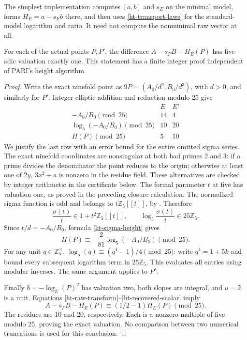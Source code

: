The simplest implementation computes \([a,b]\) and \(s_E\) on the
minimal model, forms \(H_E=a-s_Eb\) there, and then uses
\eqref{ht-transport-laws} for the standard-model logarithm and ratio.
It need not compute the nonminimal raw vector at all.

\begin{theorem}
\label{ht-mod25}
For each of the actual points \(P,P'\), the difference
\(A-s_FB-H_E(P)\) has five-adic valuation exactly one. This statement
has a finite integer proof independent of PARI's height algorithm.
\end{theorem}
\begin{proof}
Write the exact ninefold point as
\(9P=(A_0/d^2,B_0/d^3)\), with \(d>0\), and similarly for \(P'\).
Integer elliptic addition and reduction modulo 25 give
\[
\begin{array}{c|cc}
 &E&E'\\ \hline
 -A_0/B_0\pmod {25}&14&4\\
 \log_5(-A_0/B_0)\pmod {25}&10&20\\
 H(P)\pmod {25}&5&10
\end{array}
\]
We justify the last row with an error bound for the entire omitted
sigma series. The exact ninefold coordinates are nonsingular at both
bad primes 2 and 3: if a prime divides the denominator the point
reduces to the origin; otherwise at least one of
\(2y\), \(3x^2+a\) is nonzero in the residue field. These alternatives
are checked by integer arithmetic in the certificate below.
The formal parameter \(t\) at five has valuation one, as proved in
the preceding closure calculation. The normalized sigma function is
odd and belongs to \(t\mathbb Z_5[[t]]\), by
\cite[Theorem~1.3]{MazurSteinTateHeight}. Therefore
\[
 \frac{\sigma(t)}t\in1+t^2\mathbb Z_5[[t]],\qquad
 \log_5\frac{\sigma(t)}t\in25\mathbb Z_5.
\]
Since \(t/d=-A_0/B_0\), formula \eqref{ht-sigma-height} gives
\[
 H(P)\equiv-\frac2{81}\log_5(-A_0/B_0)\pmod {25}.
\]
For any unit \(q\in\mathbb Z_5^\times\),
\(\log_5(q)\equiv(q^4-1)/4\pmod {25}\): write \(q^4=1+5k\)
and bound every subsequent logarithm term in \(25\mathbb Z_5\).
This evaluates all entries using modular inverses. The same argument
applies to \(P'\).

Finally \(b=-\log_E(P)^2\) has valuation two, both slopes are
integral, and \(u=2\) is a unit. Equations
\eqref{ht-raw-transform}--\eqref{ht-recovered-scalar} imply
\[
 A-s_FB-H_E(P)\equiv(1/2-1)H_E(P)\pmod {25}.
\]
The residues are 10 and 20, respectively. Each is a nonzero multiple
of five modulo 25, proving the exact valuation. No comparison between
two numerical truncations is used for this conclusion.
\end{proof}

